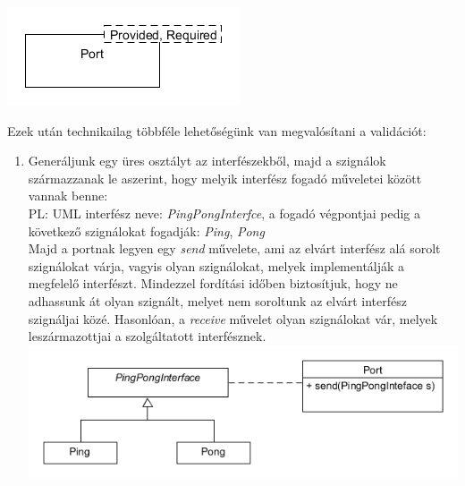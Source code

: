 \documentclass[a4paper,12pt]{report}
\begin{document}
\includegraphics[scale=0.7]{port_class.png}


Ezek után technikailag többféle lehetőségünk van megvalósítani a validációt: \\
\begin{enumerate}

\item Generáljunk egy üres osztályt az interfészekből, majd a szignálok származzanak le aszerint, hogy melyik interfész fogadó műveletei között vannak benne: \\
PL: UML interfész neve: \textit{PingPongInterfce}, a fogadó végpontjai pedig a következő szignálokat fogadják: \textit{Ping}, \textit{Pong} \\
Majd a portnak legyen egy \textit{send} művelete, ami az elvárt interfész alá sorolt szignálokat várja, vagyis olyan szignálokat, melyek implementálják a megfelelő interfészt.
Mindezzel fordítási időben biztosítjuk, hogy ne adhassunk át olyan szignált, melyet nem soroltunk az elvárt interfész szignáljai közé. Hasonlóan, a \textit{receive} művelet olyan szignálokat vár, melyek leszármazottjai a szolgáltatott interfésznek. \\

\includegraphics[scale=0.7]{inf_ver1.png} \\


\end{enumerate}
\end{document}
